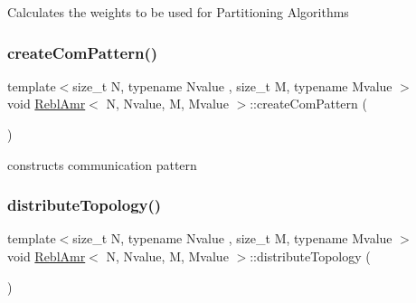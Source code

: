 Calculates the weights to be used for Partitioning Algorithms \mbox{\label{classReblAmr_a664f6f7959bec8b2f38b9ee0a1747298}} 
\subsubsection{\texorpdfstring{create\+Com\+Pattern()}{createComPattern()}}
{\footnotesize\ttfamily template$<$size\+\_\+t N, typename Nvalue , size\+\_\+t M, typename Mvalue $>$ \\
void \mbox{\hyperlink{classReblAmr}{Rebl\+Amr}}$<$ N, Nvalue, M, Mvalue $>$\+::create\+Com\+Pattern (\begin{DoxyParamCaption}{ }\end{DoxyParamCaption})}

constructs communication pattern \mbox{\label{classReblAmr_ac1be40e71c4df40ba3d4fb0086a710bf}} 
\subsubsection{\texorpdfstring{distribute\+Topology()}{distributeTopology()}}
{\footnotesize\ttfamily template$<$size\+\_\+t N, typename Nvalue , size\+\_\+t M, typename Mvalue $>$ \\
void \mbox{\hyperlink{classReblAmr}{Rebl\+Amr}}$<$ N, Nvalue, M, Mvalue $>$\+::distribute\+Topology (\begin{DoxyParamCaption}{ }\end{DoxyParamCaption})}

\mbox{\label{classReblAmr_afd423ffee7cd189fc1f2c78236e66bac}} 
